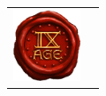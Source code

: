 \begin{titlepage}
\begin{center}
\vfill

\begin{tabular}{@{}m{2cm}@{\hskip 20pt}m{13cm}@{}}
\includegraphics[width=2cm]{../Layout/pics/seal_9th.png} &
{\fontsize{10}{12}\selectfont \textcolor{black!50}{\noindent{}}}

\ifdef{\frontpageaddstuff}{{\fontsize{10}{12}\selectfont \noindent\textcolor{black!50}{\frontpageaddstuff}}}{}

\vspace*{10pt}
\noindent{\fontsize{10}{12}\selectfont \textcolor{black!50}{\labels@license}}
\tabularnewline
\end{tabular}


\end{center}
\end{titlepage}
